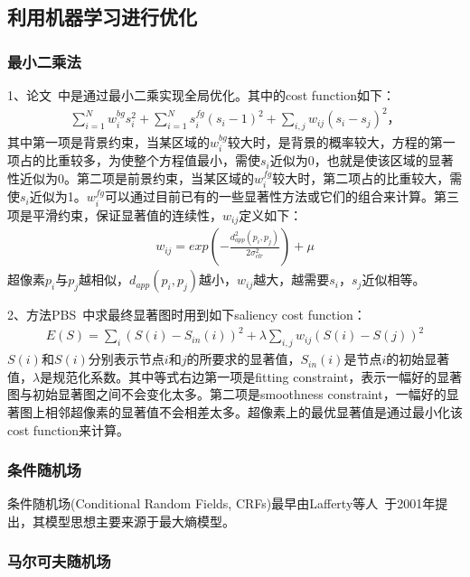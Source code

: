 \documentclass[12pt]{article}
\begin{document}
\subsection{利用机器学习进行优化}

\subsubsection{最小二乘法}

1、论文~\cite{zhu2014saliency}中是通过最小二乘实现全局优化。其中的cost function如下：
\begin{align}
\sum_{i=1}^{N}w_i^{bg}s_i^2+\sum_{i=1}^{N}s_i^{fg}(s_i-1)^2+\sum_{i, j}w_{ij}(s_i-s_j)^2，
\end{align}
其中第一项是背景约束，当某区域的$w_i^{bg}$较大时，是背景的概率较大，方程的第一项占的比重较多，为使整个方程值最小，需使$s_i$近似为0，也就是使该区域的显著性近似为0。第二项是前景约束，当某区域的$w_i^{fg}$较大时，第二项占的比重较大，需使$s_i$近似为1。$w_i^{fg}$可以通过目前已有的一些显著性方法或它们的组合来计算。第三项是平滑约束，保证显著值的连续性，$w_{ij}$定义如下：
\begin{align}
w_{ij} = exp(-\frac{d_{app}^2(p_i, p_j)}{2\sigma_{clr}^2})+\mu
\end{align}
超像素$p_i$与$p_j$越相似，$d_{app}(p_i, p_j)$越小，$w_{ij} $越大，越需要$s_i$，$s_j$近似相等。

2、方法PBS~\cite{yang2013graph}中求最终显著图时用到如下saliency cost function：
\begin{align}
E(S) = \sum_i(S(i)-S_{in}(i))^2+\lambda\sum_{i,j}w_{ij}(S(i)-S(j))^2
\end{align}
$S(i)$和$S(i)$分别表示节点$i$和$j$的所要求的显著值，$S_{in}(i)$是节点$i$的初始显著值，$\lambda$是规范化系数。其中等式右边第一项是fitting constraint，表示一幅好的显著图与初始显著图之间不会变化太多。第二项是smoothness constraint，一幅好的显著图上相邻超像素的显著值不会相差太多。超像素上的最优显著值是通过最小化该cost function来计算。

\subsubsection{条件随机场}

条件随机场(Conditional Random Fields, CRFs)最早由Lafferty等人~\cite{lafferty2001conditional}于2001年提出，其模型思想主要来源于最大熵模型。


\subsubsection{马尔可夫随机场}

%


\end{document}
